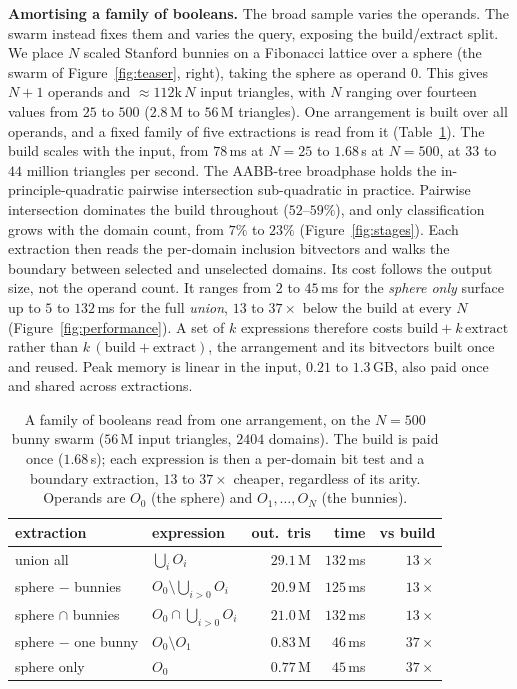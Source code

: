 \documentclass{egpubl}
\begin{document}
\textbf{Amortising a family of booleans.} The broad sample varies the operands. The swarm instead fixes them and varies the query, exposing the build/extract split. We place $N$ scaled Stanford bunnies on a Fibonacci lattice over a sphere (the swarm of Figure~\ref{fig:teaser}, right), taking the sphere as operand $0$. This gives $N{+}1$ operands and $\approx\!112\text{k}\,N$ input triangles, with $N$ ranging over fourteen values from $25$ to $500$ ($2.8$\,M to $56$\,M triangles). One arrangement is built over all operands, and a fixed family of five extractions is read from it (Table~\ref{tab:extractions}). The build scales with the input, from $78$\,ms at $N{=}25$ to $1.68$\,s at $N{=}500$, at $33$ to $44$ million triangles per second. The AABB-tree broadphase holds the in-principle-quadratic pairwise intersection sub-quadratic in practice. Pairwise intersection dominates the build throughout ($52$--$59\%$), and only classification grows with the domain count, from $7\%$ to $23\%$ (Figure~\ref{fig:stages}). Each extraction then reads the per-domain inclusion bitvectors and walks the boundary between selected and unselected domains. Its cost follows the output size, not the operand count. It ranges from $2$ to $45$\,ms for the \emph{sphere only} surface up to $5$ to $132$\,ms for the full \emph{union}, $13$ to $37\times$ below the build at every $N$ (Figure~\ref{fig:performance}). A set of $k$ expressions therefore costs $\text{build} + k\,\text{extract}$ rather than $k\,(\text{build} + \text{extract})$, the arrangement and its bitvectors built once and reused. Peak memory is linear in the input, $0.21$ to $1.3$\,GB, also paid once and shared across extractions.

\begin{table}[t]
\centering
\caption{A family of booleans read from one arrangement, on the $N{=}500$ bunny swarm ($56$\,M input triangles, $2404$ domains). The build is paid once ($1.68$\,s); each expression is then a per-domain bit test and a boundary extraction, $13$ to $37\times$ cheaper, regardless of its arity. Operands are $O_0$ (the sphere) and $O_1,\dots,O_N$ (the bunnies).}
\label{tab:extractions}
\small
\begin{tabular*}{\columnwidth}{@{\extracolsep{\fill}}llrrr@{}}
\toprule
extraction & expression & out.\ tris & time & vs build \\
\midrule
union all             & $\bigcup_i O_i$                   & $29.1$\,M & $132$\,ms & $13\times$ \\
sphere $-$ bunnies    & $O_0 \setminus \bigcup_{i>0} O_i$ & $20.9$\,M & $125$\,ms & $13\times$ \\
sphere $\cap$ bunnies & $O_0 \cap \bigcup_{i>0} O_i$      & $21.0$\,M & $132$\,ms & $13\times$ \\
sphere $-$ one bunny  & $O_0 \setminus O_1$               & $0.83$\,M & $46$\,ms  & $37\times$ \\
sphere only           & $O_0$                             & $0.77$\,M & $45$\,ms  & $37\times$ \\
\bottomrule
\end{tabular*}
\end{table}
\end{document}
